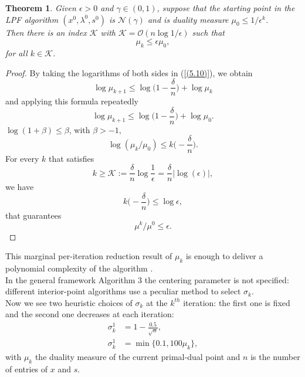 \documentclass[a4paper,10 pt,titlepage,twoside]{book}
\theoremstyle{plain}
\newtheorem{thm}{Theorem}[chapter]
\theoremstyle{definition}
\theoremstyle{remark}
\begin{document}
\begin{thm}
	Given $\epsilon>0$ and $\gamma\in(0,1)$, suppose that the starting point in the LPF algorithm $(x^{0},\lambda^{0},s^{0})$ is $\mathcal{N}(\gamma)$ and is duality measure $\mu_{0}\leq1/\epsilon^{k}$.\\ Then there is an index $\mathcal{K}$ with $\mathcal{K}=\mathcal{O}(n\log1/\epsilon)$ such that 
	\begin{equation*}\mu_{k}\leq\epsilon\mu_{0},\end{equation*} for all $k\in\mathcal{K}$.
\end{thm}
\begin{proof}
	By taking the logarithms of both sides in (\ref{(5.10)}), we obtain
	\begin{equation*}
	\log\mu_{k+1}\leq \log \bigg(1-\frac{\delta}{n}\bigg)+\log\mu_{k}\end{equation*}
	and applying this formula repeatedly
	\begin{equation*}
	\log\mu_{k+1}\leq \log \bigg(1-\frac{\delta}{n}\bigg)+\log\mu_{0}.
	\end{equation*}
	 $\log(1+\beta)\leq\beta$, with $\beta>-1$,\\
	\begin{equation*}
	\log(\mu_{k}/\mu_{0})\leq k\bigg(-\frac{\delta}{n}\bigg).
	\end{equation*}	
	For every $k$ that satisfies
	\begin{equation*}
	k\geq\mathcal{K}:= \frac{\delta}{n}\log\frac{1}{\epsilon} = \frac{\delta}{n}|\log(\epsilon)|,
	\end{equation*}
	we have 
	\begin{equation*}
	k\bigg(-\frac{\delta}{n}\bigg)\leq\log\epsilon,
	\end{equation*}	
	that guarantees
	\begin{equation*}
	\mu^{k}/\mu^{0}\leq\epsilon.
	\end{equation*}	
\end{proof}

This marginal per-iteration reduction result of $\mu_{k}$ is enough to deliver a polynomial complexity of the algorithm \cite{25y}.\\

In the general framework Algorithm 3 the centering parameter is not specified: different interior-point algorithms use a peculiar method to select $\sigma_{k}$.\\
Now we see two heuristic choices of $\sigma_{k}$ at the $k^{th}$ iteration: the first one is fixed and the second one decreases at each iteration: 
\begin{align}
\sigma^{1}_{k} &= 1 -\frac{0.5}{\sqrt{n}},\label{LPF1}\tag{4.22a}\\
\sigma^{1}_{k} &= \min\{0.1, 100\mu_{k} \},\label{LPF2}\tag{4.22b}
\end{align}
with $\mu_{k}$ the duality measure of the current primal-dual point and $n$ is the number of entries of $x$ and $s$. 
\end{document}
